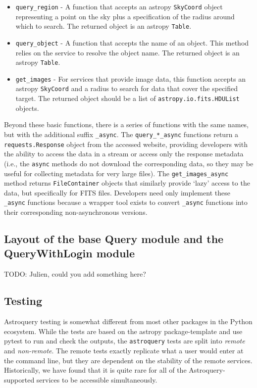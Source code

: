 \documentclass[twocolumn]{aastex61}
\newcommand{\package}[1]{\texttt{#1}\xspace}
\newcommand{\astroquery}{\package{astroquery}}
\begin{document}
\begin{itemize}
    \item \texttt{query\_region} - A function that accepts an astropy
        \texttt{SkyCoord} object representing a point on the sky plus a
        specification of the radius around which to search.
        The returned object is an astropy \texttt{Table}.
    \item \texttt{query\_object} - A function that accepts the name of an
        object.  This method relies on the service to resolve the object name.
        The returned object is an astropy \texttt{Table}.
    \item \texttt{get\_images} - For services that provide image data, this
        function accepts an astropy \texttt{SkyCoord} and a radius to search for data
        that cover the specified target. The returned object should be a list
        of \texttt{astropy.io.fits.HDUList} objects.
\end{itemize}

Beyond these basic functions, there is a series of functions with the same
names, but with the additional suffix \texttt{\_async}.  The
\texttt{query\_*\_async} functions return a \texttt{requests.Response} object
from the accessed website, providing developers with
the ability to access the data in a stream or access only the response
metadata (i.e., the \texttt{async} methods do not download the corresponding
data, so they may be useful for collecting metadata for very large files).  The
\texttt{get\_images\_async} method returns
\texttt{FileContainer} objects that similarly provide `lazy' access to the
data, but specifically for FITS files.  Developers need only implement
these \texttt{\_async} functions because a wrapper tool exists to convert
\texttt{\_async} functions into their corresponding non-asynchronous versions.

\subsection{Layout of the base Query module and the QueryWithLogin module}
{\color{red}TODO: Julien, could you add something here?}

\subsection{Testing}
Astroquery testing is somewhat different from most other packages in the Python
ecosystem.  While the tests are based on the astropy package-template and use
pytest to run and check the outputs, the \astroquery tests are split into
\emph{remote} and \emph{non-remote}.  The remote tests exactly replicate what a user
would enter at the command line, but they are dependent on the stability of the
remote services.  Historically, we have found that it is quite rare for all of
the Astroquery-supported services to be accessible simultaneously.
\end{document}
